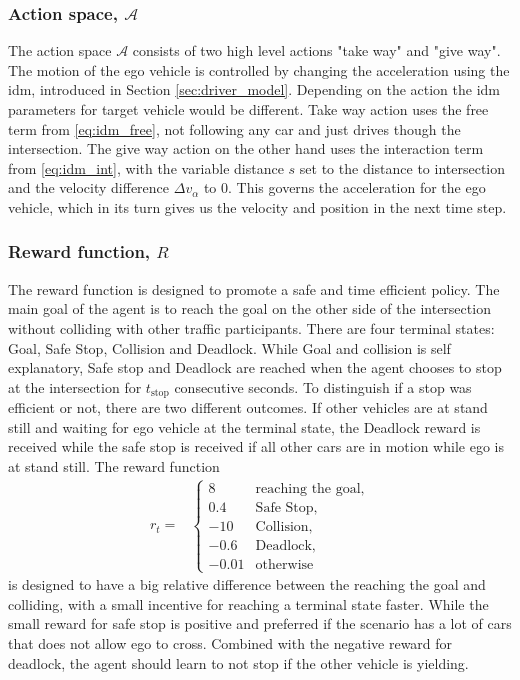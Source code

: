 	
	
	\subsubsection{Action space, $\mathcal{A}$}
	\label{sec:action}
	The action space $\mathcal{A}$ consists of two high level actions "take way" and "give way". The motion of the ego vehicle is controlled by changing the acceleration using the \gls{idm}, introduced in Section \ref{sec:driver_model}. Depending on the action the \gls{idm} parameters for target vehicle would be different.
	Take way action uses the free term from \eqref{eq:idm_free}, not following any car and just drives though the intersection. 
	The give way action on the other hand uses the interaction term from \eqref{eq:idm_int}, with the variable distance $s$ set to the distance to intersection and the velocity difference $\Delta v_\alpha$ to $0$. 
	This governs the acceleration for the ego vehicle, which in its turn gives us the velocity and position in the next time step. 
	
	\subsubsection{Reward function, $R$}
	\label{sec:reward}
	The reward function is designed to promote a safe and time efficient policy. The main goal of the agent is to reach the goal on the other side of the intersection without colliding with other traffic participants. There are four terminal states: Goal, Safe Stop, Collision and Deadlock. While Goal and collision is self explanatory, Safe stop and Deadlock are reached when the agent chooses to stop at the intersection for $t_\mathrm{stop}$ consecutive seconds.
	To distinguish if a stop was efficient or not, there are two different outcomes. If other vehicles are at stand still and waiting for ego vehicle at the terminal state, the Deadlock reward is received while the safe stop is received if all other cars are in motion while ego is at stand still. The reward function 
	\begin{align*}
	r_t = & \begin{cases}
	8 & \text{reaching the goal,}\\
	0.4 & \text{Safe Stop,}\\
	-10 & \text{Collision},\\
	-0.6 & \text{Deadlock}, \\
	-0.01 & \text{otherwise}
	\label{eq:reward}
	\end{cases} 
	\end{align*}
	is designed to have a big relative difference between the reaching the goal and colliding, with a small incentive for reaching a terminal state faster. While the small reward for safe stop is positive and preferred if the scenario has a lot of cars that does not allow ego to cross. Combined with the negative reward for deadlock, the agent should learn to not stop if the other vehicle is yielding. 
	
